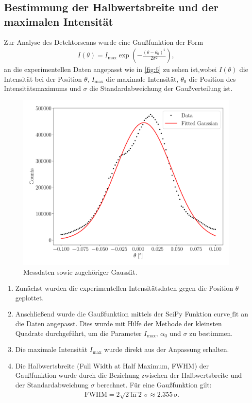 \documentclass[12pt]{article}
\begin{document}
\subsection{Bestimmung der Halbwertsbreite und der maximalen Intensität}
Zur Analyse des Detektorscans wurde eine Gaußfunktion der Form
\begin{align*}
I(\theta) = I_{\text{max}} \exp \left( -\frac{(\theta - \theta_0)^2}{2\sigma^2} \right),
\end{align*}
an die experimentellen Daten angepasst wie in \autoref{fig:6} zu sehen ist,wobei $I(\theta)$ die Intensität bei der Position $\theta$, $I_{\text{max}}$ die maximale Intensität, \(\theta_0\) die Position des Intensitätsmaximums und \(\sigma\) die Standardabweichung der Gaußverteilung ist.
\begin{figure}[H]
  \centering
  \includegraphics[scale=0.5]{Ressourcen/detektor1.pdf}
  \caption{Messdaten sowie zugehöriger Gaussfit.}\label{fig:6}
\end{figure}
\begin{enumerate}
    \item Zunächst wurden die experimentellen Intensitätsdaten gegen die Position \(\theta\) geplottet.
    \item Anschließend wurde die Gaußfunktion mittels der SciPy Funktion $\text{curve\_fit}$ an die Daten angepasst\cite{scipy}. Dies wurde mit Hilfe der Methode der kleinsten Quadrate durchgeführt, um die Parameter \(I_{\text{max}}\), \(\alpha_0\) und \(\sigma\) zu bestimmen.
    \item Die maximale Intensität \(I_{\text{max}}\) wurde direkt aus der Anpassung erhalten.
    \item Die Halbwertsbreite (Full Width at Half Maximum, FWHM) der Gaußfunktion wurde durch die Beziehung zwischen der Halbwertsbreite und der Standardabweichung \(\sigma\) berechnet. Für eine Gaußfunktion gilt:
    \begin{align*}
    \text{FWHM} = 2 \sqrt{2 \ln 2} \, \sigma \approx 2.355 \, \sigma.
    \end{align*}
\end{enumerate}
\end{document}
